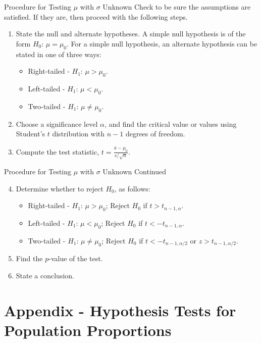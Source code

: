 \documentclass[pdf]{beamer}
\theoremstyle{remark}
\theoremstyle{definition}
\begin{document}
\begin{frame}[t]{Procedure for Testing $\mu$ with $\sigma$ Unknown }
Check to be sure the assumptions are satisfied. If they are, then proceed with the following steps. \\
\vspace{1.5ex}
\begin{enumerate}
\item State the null and alternate hypotheses. A simple null hypothesis is of the form $H_0\text{: }  \mu =\mu_0$. For a simple null hypothesis, an alternate hypothesis can be stated in one of three ways:
 \begin{itemize}
  \item Right-tailed - $H_1\text{: }  \mu > \mu_0$.
  \item Left-tailed - $H_1\text{: }  \mu < \mu_0$.
  \item Two-tailed - $H_1\text{: }  \mu \ne \mu_0$.
\end{itemize}
\item Choose a significance level $\alpha$, and find the critical value or values using Student's $t$ distribution with $n-1$ degrees of freedom.
\item Compute the test statistic, $t =\frac{\bar{x} - \mu_0}{s/\sqrt{n}}$. 
\end{enumerate}
\end{frame}

\begin{frame}[t]{Procedure for Testing $\mu$ with $\sigma$ Unknown Continued}
\begin{enumerate}
  \setcounter{enumi}{3}
\item Determine whether to reject $H_0$, as follows:
 \begin{itemize}
  \item Right-tailed - $H_1\text{: }  \mu > \mu_0$; Reject $H_0$ if $t > t_{n-1,\alpha}$.
  \item Left-tailed - $H_1\text{: }  \mu < \mu_0$; Reject $H_0$ if $t < -t_{n-1,\alpha}$.
  \item Two-tailed - $H_1\text{: }  \mu \ne \mu_0$; Reject $H_0$ if $t < -t_{n-1,\alpha/2}$ or $z > t_{n-1,\alpha/2}$.
\end{itemize}
\item Find the $p$-value of the test. 
\item State a conclusion.
\end{enumerate}
\end{frame}

\section{Appendix - Hypothesis Tests for Population Proportions}
\end{document}
